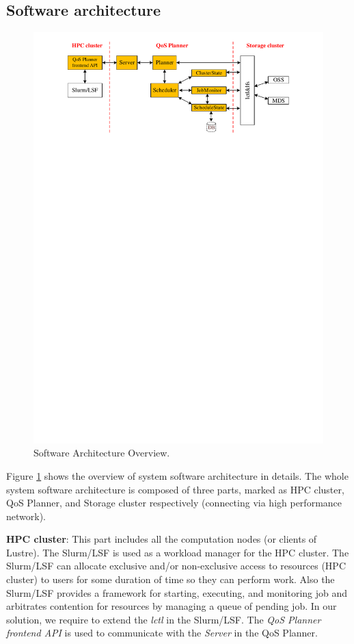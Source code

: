 \documentclass[10pt]{article}
\begin{document}
\subsection{Software architecture}
\begin{figure}[!ht]
\centering
\includegraphics[width=.8\columnwidth]{figures/software_architecture_overview.pdf}
\caption{Software Architecture Overview.}
\label{fig:swarc_overview}
\end{figure}


Figure \ref{fig:swarc_overview} shows the overview of system software architecture in details. The whole system software architecture is composed of three parts, marked as HPC cluster, QoS Planner, and Storage cluster respectively (connecting via high performance network).

\textbf{HPC cluster}: This part includes all the computation nodes (or clients of Lustre). The Slurm/LSF is used as a workload manager for the HPC cluster. The Slurm/LSF can allocate exclusive and/or non-exclusive access to resources (HPC cluster) to users for some duration of time so they can perform work. Also the Slurm/LSF provides a framework for starting, executing, and monitoring job and arbitrates contention for resources by managing a queue of pending job. In our solution, we require to extend the \emph{lctl} in the Slurm/LSF. The \emph{QoS Planner frontend API} is used to communicate with the \emph{Server} in the QoS Planner.
\end{document}
